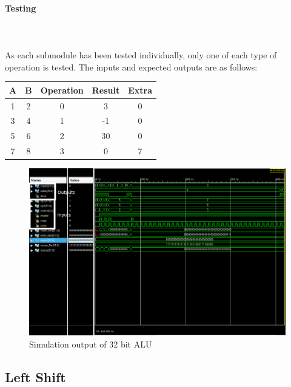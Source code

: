 \documentclass{article}
\begin{document}
    \paragraph{Testing}
    \hfill\\\\
    As each submodule has been tested individually, only one of each type
    of operation is tested. The inputs and expected outputs are as follows:

    \begin{center}
        \begin{tabular}{|c|c|c||c|c|}
            \hline
            A & B & Operation & Result & Extra
            \\\hline\hline
            1 & 2 & 0 & 3 & 0
            \\\hline
            3 & 4 & 1 & -1 & 0
            \\\hline
            5 & 6 & 2 & 30 & 0
            \\\hline
            7 & 8 & 3 & 0 & 7
            \\\hline
        \end{tabular}
    \end{center}


    \begin{figure}[H]
        \centering
        \includegraphics[width=0.9\paperwidth,center]{Screenshots/alu_32.png}
        \caption{Simulation output of 32 bit ALU}
    \end{figure}



    \subsection{Left Shift}
\end{document}
